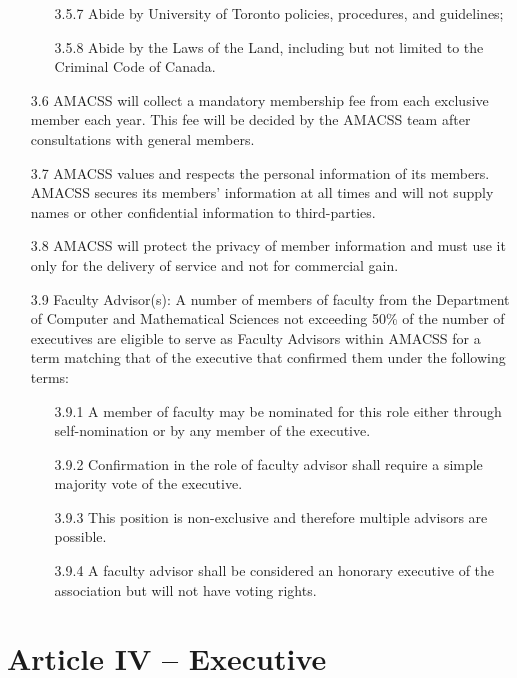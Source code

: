 \documentclass[12pt,a4paper]{article}
\begin{document}
\begin{enumerate}
\begin{enumerate}
\item[3.5.7] Abide by University of Toronto policies, procedures, and guidelines;

\item[3.5.8] Abide by the Laws of the Land, including but not limited to the Criminal Code of Canada.
\end{enumerate}

\item[3.6] AMACSS will collect a mandatory membership fee from each exclusive member each year. This fee will be decided by the AMACSS team after consultations with general members.

\item[3.7] AMACSS values and respects the personal information of its members. AMACSS secures its members' information at all times and will not supply names or other confidential information to third-parties.

\item[3.8] AMACSS will protect the privacy of member information and must use it only for the delivery of service and not for commercial gain.

\item[3.9] Faculty Advisor(s): A number of members of faculty from the Department of Computer and Mathematical Sciences not exceeding 50\% of the number of executives are eligible to serve as Faculty Advisors within AMACSS for a term matching that of the executive that confirmed them under the following terms:

\begin{enumerate}
\item[3.9.1] A member of faculty may be nominated for this role either through self-nomination or by any member of the executive.

\item[3.9.2] Confirmation in the role of faculty advisor shall require a simple majority vote of the executive.

\item[3.9.3] This position is non-exclusive and therefore multiple advisors are possible.

\item[3.9.4] A faculty advisor shall be considered an honorary executive of the association but will not have voting rights.
\end{enumerate}
\end{enumerate}

\section*{Article IV – Executive}
\end{document}
